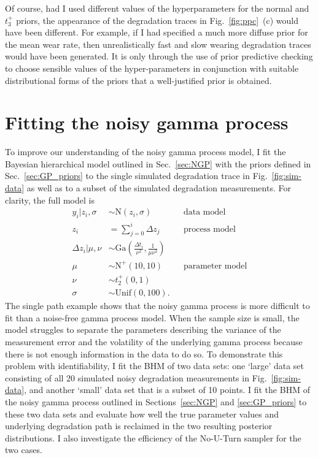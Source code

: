 Of course, had I used different values of the hyperparameters for the normal and $t_3^{+}$ priors, the appearance of the degradation traces in Fig.~\ref{fig:ppc}~(c) would have been different. For example, if I had specified a much more diffuse prior for the mean wear rate, then unrealistically fast and slow wearing degradation traces would have been generated. It is only through the use of prior predictive checking to choose sensible values of the hyper-parameters in conjunction with suitable distributional forms of the priors that a well-justified prior is obtained.

\section{Fitting the noisy gamma process} \label{sec:NGP-fitting}

To improve our understanding of the noisy gamma process model, I fit the Bayesian hierarchical model outlined in Sec.~\ref{sec:NGP} with the priors defined in Sec.~\ref{sec:GP_priors} to the single simulated degradation trace in Fig.~\ref{fig:sim-data} as well as to a subset of the simulated degradation measurements. For clarity, the full model is
\begin{align*}
  y_i|z_i, \sigma & \sim \mbox{N}(z_i, \sigma)  && \mbox{data model} \\
  z_i & = \sum_{j=0}^i \Delta z_j && \mbox{process model} \\ 
  \Delta z_i|\mu, \nu & \sim \mbox{Ga} \left( \frac{\Delta t_i}{\nu^2}, \frac{1}{\mu \nu^2} \right) \\
  \mu & \sim \mbox{N}^{+}(10, 10) && \mbox{parameter model} \\
  \nu & \sim t_2^{+}(0, 1) \\
  \sigma & \sim \mbox{Unif}(0, 100).
\end{align*}
The single path example shows that the noisy gamma process is more difficult to fit than a noise-free gamma process model. When the sample size is small, the model struggles to separate the parameters describing the variance of the measurement error and the volatility of the underlying gamma process because there is not enough information in the data to do so. To demonstrate this problem with identifiability, I fit the BHM of two data sets: one `large' data set consisting of all 20 simulated noisy degradation measurements in Fig.~\ref{fig:sim-data}, and another `small' data set that is a subset of 10 points. I fit the BHM of the noisy gamma process outlined in Sections~\ref{sec:NGP} and \ref{sec:GP_priors} to these two data sets and evaluate how well the true parameter values and underlying degradation path is reclaimed in the two resulting posterior distributions. I also investigate the efficiency of the No-U-Turn sampler for the two cases.

